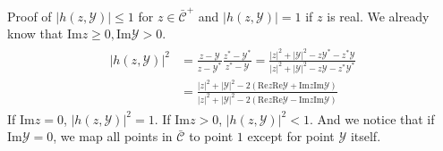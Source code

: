 \documentclass[
	preprint,%
	aps,
	prb,
	showpacs,	
	amsmath, amssymb]{revtex4-2}
\DeclareRobustCommand{\+}{\hstretch{1.25} {\boldsymbol {\mathrel{+}}}}
\newcommand{\im}{ {\mathrm{Im}} }
\newcommand{\re}{ {\mathrm{Re}} }
\newcommand{\Y}{ {\mathcal{Y}} }
\newcommand{\Cbar}{ {\bar{\mathcal{C}}} }
\begin{document}
Proof of $|h(z, \Y)| \leq 1$ for $z \in \Cbar^+$ and
$|h(z, \Y)| = 1$ if $z$ is real. 
We already know that $\im z \geq 0,  \im \Y >0$.
\begin{align}
\begin{split}
|h(z, \Y)|^2 &= \frac{z - \Y}{z - \Y^*} \frac{z^* - \Y^*}{z^* - \Y} 
	  = \frac{|z|^2 + |\Y|^2 - z\Y^* - z^*\Y}{|z|^2 + |\Y|^2 - z\Y - z^*\Y^*}\\
	& = \frac{|z|^2 + |\Y|^2 - 2(\re z \re \Y  + \im z \im \Y)}
		{|z|^2 + |\Y|^2 - 2(\re z \re \Y  - \im z \im \Y)}
\end{split}
\end{align}
If $\im z = 0$, $|h(z, \Y)|^2 = 1$. If $\im z > 0$, $|h(z, \Y)|^2 < 1$.
And we notice that if $\im \Y = 0$, we map all points in $\Cbar$ to 
point $1$ except for point $\Y$ itself.


\end{document}
